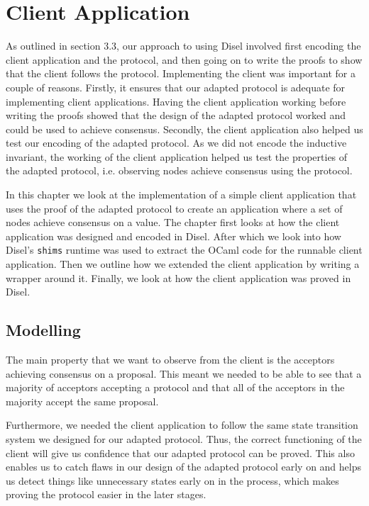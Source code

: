 \chapter{Client Application}
As outlined in section 3.3, our approach to using Disel involved first encoding
the client application and the protocol, and then going on to write the proofs
to show that the client follows the protocol.
Implementing the client was important for a couple of reasons.
Firstly, it ensures that our adapted protocol is adequate for
implementing client applications. Having the client application working before
writing the proofs showed
that the design of the adapted protocol worked and could be used
to achieve consensus. Secondly, the client application also helped us test
our encoding of the adapted protocol. As we did not encode the inductive invariant,
the working of the client application helped us test the properties of the
adapted protocol, i.e. observing nodes achieve consensus using the protocol.

In this chapter we look at the implementation of a simple client application
that uses the proof of the adapted protocol to create an application where
a set of nodes achieve consensus on a value. The chapter first looks at how the client
application was designed and encoded in Disel. After which we look into how
Disel's \texttt{shims} runtime was used to extract the OCaml code for the
runnable client application. Then we outline how we extended the client
application by writing a wrapper around it. Finally, we look at how the client
application was proved in Disel.

\section{Modelling}

The main property that we want to observe from the client is the acceptors achieving
consensus on a proposal. This meant we needed to be able to see that a majority of
acceptors accepting a protocol and that all of the acceptors in the majority
accept the same proposal.

Furthermore, we needed the client application to follow the same state transition
system we designed for our adapted protocol. Thus, the correct functioning of the
client will give us confidence that our adapted protocol can be proved. This also
enables us to catch flaws in our design of the adapted protocol early on and helps
us detect things like unnecessary states early on in the process, which makes
proving the protocol easier in the later stages.

